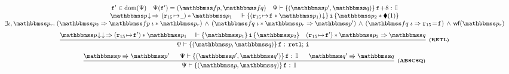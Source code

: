 \begin{figure*}[!t]
{\begin{minipage}{1\textwidth}
\[\begin{array}{c}
{                    }
                    {
                        \begin{array}{c}
                            \lab{}' \in \dom(\Cspec) \quad
                            \Cspec (\lab{}') = (\relspecpre, \relspecpost) \quad
                            \wdcblk{\Cspec}{\relastP'}
                                {\relastQ}{\lab{}\!+\!8}{\cblk} \\
                            \nxtAst{\relastP} \,\Rightarrow\,
                                (\regst{\reg{15}}{\notCare})
                                    * \relastP_1
                            \quad
                            \relwfins{\asrttm{(\regst{\reg{15}}{\lab{}} * \relastP_1)}}
                            {\simplins}{\relastP_2 \sepstar \metricAst{1}}  \\
                            \exists  \lgvl, \relastP_r. \;
                            \supimpl{\relastP_2}{\relastP'}
                                {\relspecpre \; \lgvl * \relastP_r}
                                {\relspecpost \; \lgvl * \relastP_r} \, \wedge \,
                            (\relspecpost \; \lgvl \Rightarrow \reg{15} \!=\! \lab{})
                            \,\land\,\wfFrm(\relastP_r)
                        \end{array}	
                    } \\
                    \\[-5pt]
                    \infer[\tinybftext{(RETL)}]
                    {
                        \wdcblk{\Cspec}{\relastP}{\relastQ}{\lab{}}{\retl; \, \simplins}
                    }
                    {
                        \nxtAst{\nxtAst{\relastP}} \,\Rightarrow
                        (\regst\RAreg{\lab{}'}) \sepstar \relastP_1
                        \quad
                        \relwfins{\relastP_1}{\simplins}{\relastP_2}
                        \quad
                        (\regst\RAreg{\lab{}'}) \sepstar
                                    \relastP_2 \Rightarrow \relastQ
                    } \\
                    \\[-5pt]
                    \infer[\tinybftext{(ABSCSQ)}]
                    {
                        \wdcblk{\Cspec}{\relastP}{\relastQ}
                            {\lab{}}{\cblk}
                    }
                    {
                        \absExec{\relastP}{\relastP'} \quad \ \
                        \wdcblk{\Cspec}{\relastP'}{\relastQ'}
                            {\lab{}}{\cblk}
                        \quad \ \
                        \absExec{\relastQ'}{\relastQ}
                    }
                \end{array}
            \]
        \end{minipage}
    }


\end{figure*}
